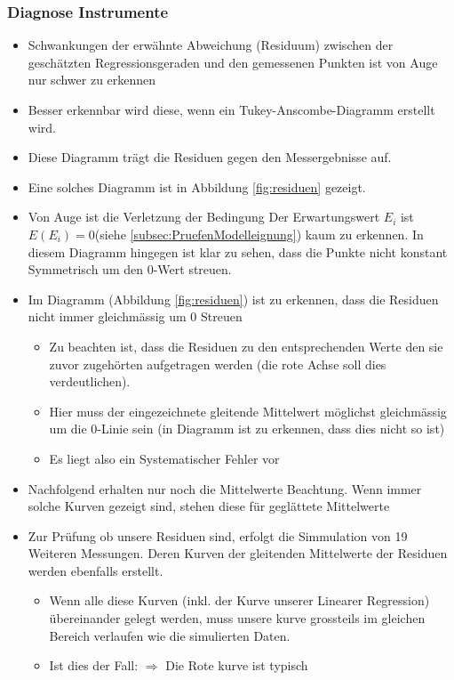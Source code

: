 \subsubsection{Diagnose Instrumente}
\begin{itemize}
	\item Schwankungen der erwähnte Abweichung (Residuum) zwischen der geschätzten Regressionsgeraden und den gemessenen Punkten  ist von Auge nur schwer zu erkennen
	\item Besser erkennbar wird diese, wenn ein Tukey-Anscombe-Diagramm erstellt wird.
	\item Diese Diagramm trägt die Residuen gegen den Messergebnisse auf.
	\item Eine solches Diagramm ist in Abbildung \ref{fig:residuen} gezeigt.
	\item Von Auge ist die Verletzung der Bedingung \grqq Der Erwartungswert $E_i$ ist $E(E_i)=0$\glqq (siehe \ref{subsec:PruefenModelleignung}) kaum zu erkennen. In diesem Diagramm hingegen ist klar zu sehen, dass die Punkte nicht konstant Symmetrisch um den 0-Wert streuen.
	\item Im Diagramm (Abbildung \ref{fig:residuen}) ist zu erkennen, dass die Residuen nicht immer gleichmässig um 0 Streuen
	\begin{itemize}
		\item Zu beachten ist, dass die Residuen zu den entsprechenden Werte den sie zuvor zugehörten aufgetragen werden (die rote Achse soll dies verdeutlichen).
		\item Hier muss der eingezeichnete gleitende Mittelwert möglichst gleichmässig um die 0-Linie sein (in Diagramm ist zu erkennen, dass dies nicht so ist)
		\item Es liegt also ein Systematischer Fehler vor
	\end{itemize}
	\item Nachfolgend erhalten nur noch die Mittelwerte Beachtung. Wenn immer solche Kurven gezeigt sind, stehen diese für geglättete Mittelwerte
	\item Zur Prüfung ob unsere Residuen sind, erfolgt die Simmulation von 19 Weiteren Messungen. Deren Kurven der gleitenden Mittelwerte der Residuen werden ebenfalls erstellt. 
	\begin{itemize}
		\item Wenn alle diese Kurven  (inkl. der Kurve unserer Linearer Regression) übereinander gelegt werden, muss unsere kurve grossteils im gleichen Bereich verlaufen wie die simulierten Daten. 
		\item Ist dies der Fall: $\Rightarrow$ Die Rote kurve ist typisch

\end{itemize}
\end{itemize}
